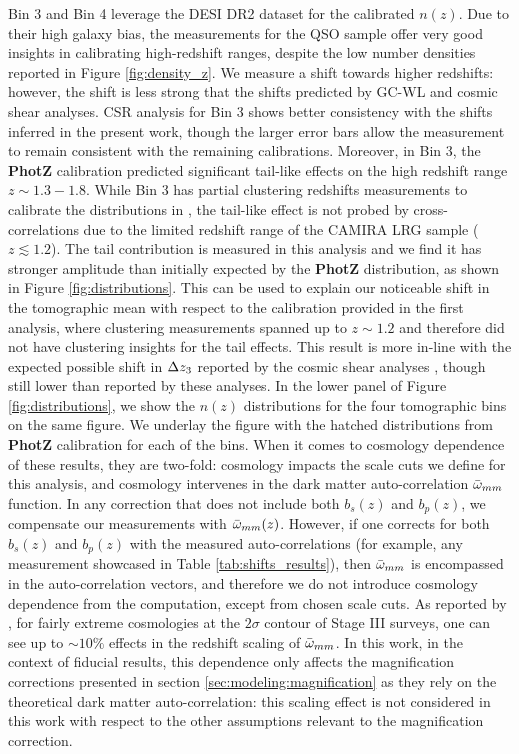 Bin 3 and Bin 4 leverage the DESI DR2 dataset for the calibrated $n(z)$. 
Due to their high galaxy bias, the measurements for the QSO sample offer very good insights in calibrating high-redshift ranges, despite the low number densities reported in Figure \ref{fig:density_z}. 
We measure a shift towards higher redshifts: however, the shift is less strong that the shifts predicted by GC-WL and cosmic shear analyses. CSR analysis for Bin 3 shows better consistency with the shifts inferred in the present work, though the larger error bars allow the measurement to remain consistent with the remaining calibrations. 
Moreover, in Bin 3, the \textbf{PhotZ} calibration predicted significant tail-like effects on the high redshift range $z\sim1.3-1.8$. 
While Bin 3 has partial clustering redshifts measurements to calibrate the distributions in \cite{HSCClusteringRau2023}, the tail-like effect is not probed by cross-correlations due to the limited redshift range of the CAMIRA LRG sample ($z\lesssim1.2$).
The tail contribution is measured in this analysis and we find it has stronger amplitude than initially expected by the \textbf{PhotZ} distribution, as shown in Figure \ref{fig:distributions}. 
This can be used to explain our noticeable shift in the tomographic mean with respect to the calibration provided in the first analysis, where clustering measurements spanned up to $z\sim1.2$ and therefore did not have clustering insights for the tail effects.
This result is more in-line with the expected possible shift in $\Delta z_3$ reported by the cosmic shear analyses \cite{Dalal2023CosmoShearHSC, CosmoShearLi2023HSCY3}, though still lower than reported by these analyses. 
In the lower panel of Figure \ref{fig:distributions}, we show the $n(z)$ distributions for the four tomographic bins on the same figure. We underlay the figure with the hatched distributions from \textbf{PhotZ} calibration for each of the bins. 
When it comes to cosmology dependence of these results, they are two-fold: cosmology impacts the scale cuts we define for this analysis, and cosmology intervenes in the dark matter auto-correlation $\bar{\omega}_{mm}$ function. In any correction that does not include both $b_s(z)$ and $b_p(z)$, we compensate our measurements with $\bar{\omega}_{mm}(z)$. However, if one corrects for both $b_s(z)$ and $b_p(z)$ with the measured auto-correlations (for example, any measurement showcased in Table \ref{tab:shifts_results}), then $\bar{\omega}_{mm}$ is encompassed in the auto-correlation vectors, and therefore we do not introduce cosmology dependence from the computation, except from chosen scale cuts. As reported by \cite{HSCClusteringRau2023}, for fairly extreme cosmologies at the $2\sigma$ contour of Stage III surveys, one can see up to $\sim10\%$ effects in the redshift scaling of $\bar{\omega}_{mm}$. In this work, in the context of fiducial results, this dependence only affects the magnification corrections presented in section \ref{sec:modeling:magnification} as they rely on the theoretical dark matter auto-correlation: this scaling effect is  not considered in this work with respect to the other assumptions relevant to the magnification correction.